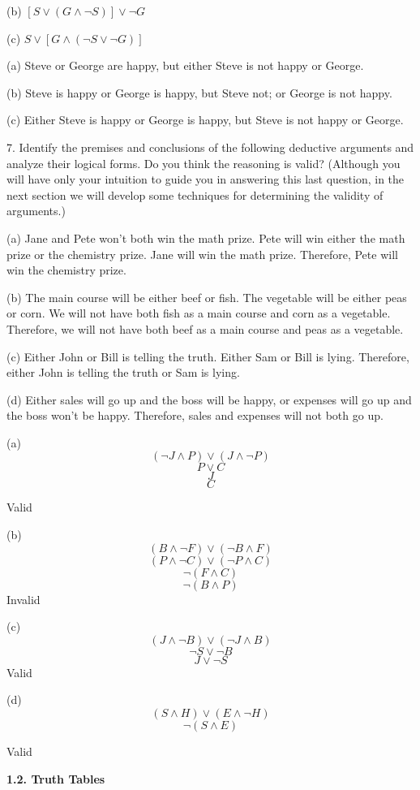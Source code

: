 \documentclass{article}
\begin{document}
\hspace{12pt}(b) $[S \lor (G \land \neg S)] \lor \neg G$

\hspace{12pt}(c) $S \lor [G \land (\neg S \lor \neg G)]$
\vspace{20pt}

(a) Steve or George are happy, but either Steve is not happy or George.

(b) Steve is happy or George is happy, but Steve not; or George is not happy.

(c) Either Steve is happy or George is happy, but Steve is not happy or George.
\vspace{40pt}

7. Identify the premises and conclusions of the following deductive arguments
and analyze their logical forms. Do you think the reasoning is valid?
(Although you will have only your intuition to guide you in answering
this last question, in the next section we will develop some techniques for
determining the validity of arguments.)

\hspace{12pt}(a) Jane and Pete won’t both win the math prize. Pete will win either
the math prize or the chemistry prize. Jane will win the math prize.
Therefore, Pete will win the chemistry prize.

\hspace{12pt}(b) The main course will be either beef or fish. The vegetable will be either
peas or corn. We will not have both fish as a main course and corn as a
vegetable. Therefore, we will not have both beef as a main course and
peas as a vegetable.

\hspace{12pt}(c) Either John or Bill is telling the truth. Either Sam or Bill is lying.
Therefore, either John is telling the truth or Sam is lying.

\hspace{12pt}(d) Either sales will go up and the boss will be happy, or expenses will go
up and the boss won’t be happy. Therefore, sales and expenses will not
both go up.
\vspace{20pt}

(a) $$(\neg J \land P) \lor (J \land \neg P)$$
$$P \lor C$$
$$J$$
$$C$$

Valid

\vspace{20pt}

(b) $$(B \land \neg F) \lor (\neg B \land F)$$
$$(P \land \neg C) \lor (\neg P \land C)$$
$$\neg (F \land C)$$
$$\neg (B \land P)$$
Invalid

\vspace{20pt}

(c) $$(J \land \neg B) \lor (\neg J \land B)$$
$$\neg S \lor \neg B$$
$$J \lor \neg S$$
Valid

\vspace{20pt}

(d) $$(S \land H) \lor (E \land \neg H)$$
$$\neg (S \land E)$$

Valid

\vspace{50pt}

\textbf{1.2. Truth Tables}

\vspace{40pt}
\end{document}
